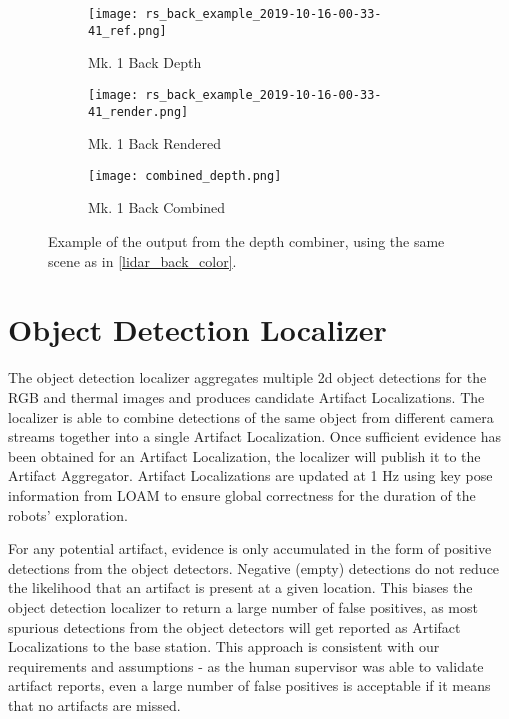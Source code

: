 \begin{figure}
	\centering
	\begin{subfigure}{0.32\textwidth}
		\texttt{[image: rs\_back\_example\_2019-10-16-00-33-41\_ref.png]}
		\caption{Mk. 1 Back Depth}
		\label{combined_depth_realsense}		
	\end{subfigure}
	\hfill
	\begin{subfigure}{0.32\textwidth}
		\texttt{[image: rs\_back\_example\_2019-10-16-00-33-41\_render.png]}
		\caption{Mk. 1 Back Rendered}
		\label{combined_depth_lidar}
	\end{subfigure}	
	\hfill
	\begin{subfigure}{0.32\textwidth}
		\texttt{[image: combined\_depth.png]}
		\caption{Mk. 1 Back Combined}
		\label{combined_depth_output}
	\end{subfigure}		
	\caption[Depth combiner sample output]{Example of the output from the depth combiner, using the same scene as in \ref{lidar_back_color}.}
	\label{combined_depth}
\end{figure}


\section{Object Detection Localizer}

The object detection localizer aggregates multiple 2d object detections for the RGB and thermal images and produces candidate Artifact Localizations. The localizer is able to combine detections of the same object from different camera streams together into a single Artifact Localization. Once sufficient evidence has been obtained for an Artifact Localization, the localizer will publish it to the Artifact Aggregator. Artifact Localizations are updated at 1 Hz using key pose information from LOAM to ensure global correctness for the duration of the robots' exploration. 

For any potential artifact, evidence is only accumulated in the form of positive detections from the object detectors. Negative (empty) detections do not reduce the likelihood that an artifact is present at a given location. This biases the object detection localizer to return a large number of false positives, as most spurious detections from the object detectors will get reported as Artifact Localizations to the base station. This approach is consistent with our requirements and assumptions - as the human supervisor was able to validate artifact reports, even a large number of false positives is acceptable if it means that no artifacts are missed.


